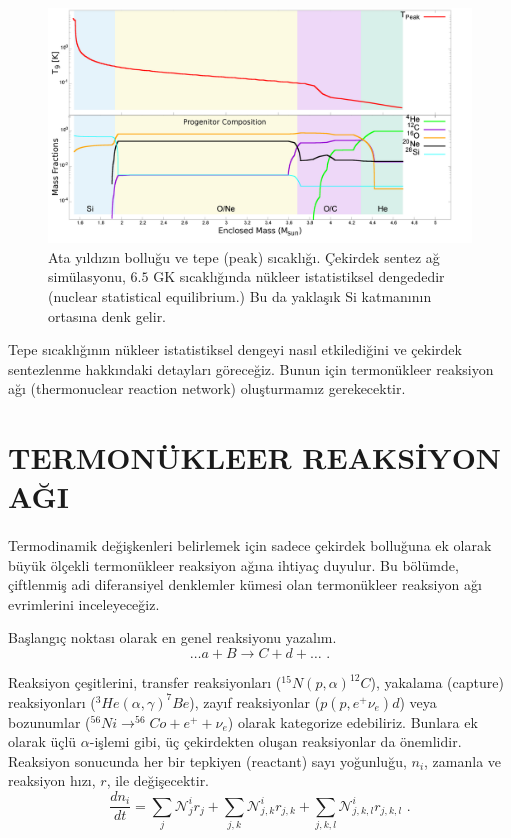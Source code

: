 \begin{figure}[hbt!]
	\centering
	\includegraphics[width=\textwidth]{figures/progenitorAbund_Temp.png}
	\caption[Ata Yıldızın Bolluğu Ve Tepe (Peak) Sıcaklığı.]{Ata yıldızın bolluğu ve tepe (peak) sıcaklığı. Çekirdek sentez ağ simülasyonu, $ 6.5 $ GK sıcaklığında nükleer istatistiksel dengededir (nuclear statistical equilibrium.) Bu da yaklaşık Si katmanının ortasına denk gelir.}
	\label{fig:progenitorAbund_Temp}
\end{figure}

Tepe sıcaklığının nükleer istatistiksel dengeyi nasıl etkilediğini ve çekirdek sentezlenme hakkındaki detayları göreceğiz. Bunun için termonükleer reaksiyon ağı (thermonuclear reaction network) oluşturmamız gerekecektir.

\section{TERMONÜKLEER REAKSİYON AĞI}\label{sec:termoNukleerReakAg}
\paragraph{}
Termodinamik değişkenleri belirlemek için sadece çekirdek bolluğuna ek olarak büyük ölçekli termonükleer reaksiyon ağına ihtiyaç duyulur. Bu bölümde, çiftlenmiş adi diferansiyel denklemler kümesi olan termonükleer reaksiyon ağı evrimlerini inceleyeceğiz.

Başlangıç noktası olarak en genel reaksiyonu yazalım.
\begin{equation}
    \dots a+B \rightarrow C+d+ \dots \text{ .}
\end{equation}

Reaksiyon çeşitlerini, transfer reaksiyonları ($ ^{15}N(p,\alpha)^{12}C $), yakalama (capture) reaksiyonları ($ ^{3}He(\alpha,\gamma)^{7}Be $), zayıf reaksiyonlar ($ p(p,e^{+}\nu_{e})d $) veya bozunumlar ($ ^{56}Ni\rightarrow^{56}Co+e^{+}+\nu_{e} $) olarak kategorize edebiliriz. Bunlara ek olarak üçlü $ \alpha $-işlemi gibi, üç çekirdekten oluşan reaksiyonlar da önemlidir. Reaksiyon sonucunda her bir tepkiyen (reactant) sayı yoğunluğu, $ n_{i} $, zamanla ve reaksiyon hızı, $ r $, ile değişecektir.
\begin{equation}\label{eqn:networkDif1}
    \frac{d n_{i}}{d t}=\sum_{j} \mathcal{N}^{i}_{j}r_{j}+\sum_{j,k} \mathcal{N}^{i}_{j,k}r_{j,k}+\sum_{j,k,l} \mathcal{N}^{i}_{j,k,l}r_{j,k,l} \text{ .}
\end{equation}

